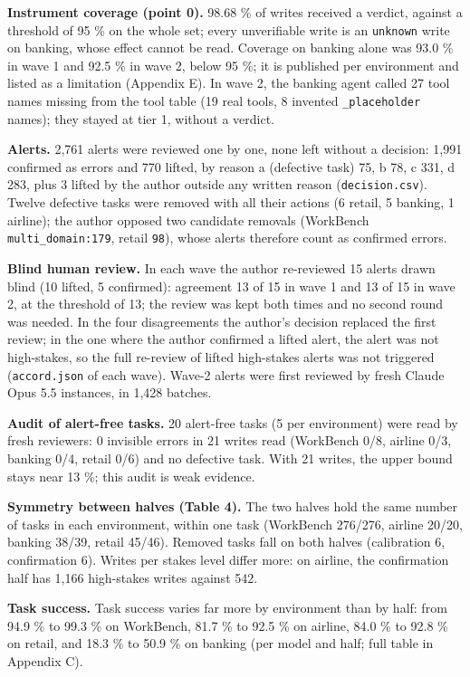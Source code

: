 \textbf{Instrument coverage (point 0).} 98.68 \% of writes received a verdict, against a threshold of 95 \% on the whole set; every unverifiable write is an \texttt{unknown} write on banking, whose effect cannot be read. Coverage on banking alone was 93.0 \% in wave 1 and 92.5 \% in wave 2, below 95 \%; it is published per environment and listed as a limitation (Appendix E). In wave 2, the banking agent called 27 tool names missing from the tool table (19 real tools, 8 invented \texttt{\_\allowbreak{}placeholder} names); they stayed at tier 1, without a verdict.

\textbf{Alerts.} 2,761 alerts were reviewed one by one, none left without a decision: 1,991 confirmed as errors and 770 lifted, by reason a (defective task) 75, b 78, c 331, d 283, plus 3 lifted by the author outside any written reason (\texttt{decision.\allowbreak{}csv}). Twelve defective tasks were removed with all their actions (6 retail, 5 banking, 1 airline); the author opposed two candidate removals (WorkBench \texttt{multi\_\allowbreak{}domain:179}, retail \texttt{98}), whose alerts therefore count as confirmed errors.

\textbf{Blind human review.} In each wave the author re-reviewed 15 alerts drawn blind (10 lifted, 5 confirmed): agreement 13 of 15 in wave 1 and 13 of 15 in wave 2, at the threshold of 13; the review was kept both times and no second round was needed. In the four disagreements the author's decision replaced the first review; in the one where the author confirmed a lifted alert, the alert was not high-stakes, so the full re-review of lifted high-stakes alerts was not triggered (\texttt{accord.\allowbreak{}json} of each wave). Wave-2 alerts were first reviewed by fresh Claude Opus 5.5 instances, in 1,428 batches.

\textbf{Audit of alert-free tasks.} 20 alert-free tasks (5 per environment) were read by fresh reviewers: 0 invisible errors in 21 writes read (WorkBench 0/8, airline 0/3, banking 0/4, retail 0/6) and no defective task. With 21 writes, the upper bound stays near 13 \%; this audit is weak evidence.

\textbf{Symmetry between halves (Table 4).} The two halves hold the same number of tasks in each environment, within one task (WorkBench 276/276, airline 20/20, banking 38/39, retail 45/46). Removed tasks fall on both halves (calibration 6, confirmation 6). Writes per stakes level differ more: on airline, the confirmation half has 1,166 high-stakes writes against 542.

\textbf{Task success.} Task success varies far more by environment than by half: from 94.9 \% to 99.3 \% on WorkBench, 81.7 \% to 92.5 \% on airline, 84.0 \% to 92.8 \% on retail, and 18.3 \% to 50.9 \% on banking (per model and half; full table in Appendix C).

